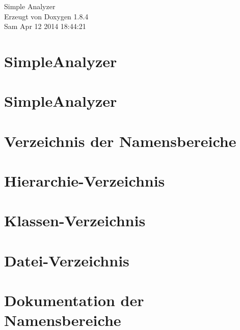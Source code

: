 \documentclass[twoside]{book}
\newcommand{\clearemptydoublepage}{%
  \newpage{\pagestyle{empty}\cleardoublepage}%
}
\begin{document}
\hypersetup{pageanchor=false}
\begin{titlepage}
\vspace*{7cm}
\begin{center}%
{\Large Simple Analyzer }\\
\vspace*{1cm}
{\large Erzeugt von Doxygen 1.8.4}\\
\vspace*{0.5cm}
{\small Sam Apr 12 2014 18:44:21}\\
\end{center}
\end{titlepage}
\clearemptydoublepage
\tableofcontents
\clearemptydoublepage
{}
\hypersetup{pageanchor=true}

\chapter{Simple\-Analyzer}
\label{index}\hypertarget{index}{}
\chapter{Simple\-Analyzer}
\label{md__daten_Projekte_eclipse_workspace_README}
\hypertarget{md__daten_Projekte_eclipse_workspace_README}{}

\chapter{Verzeichnis der Namensbereiche}

\chapter{Hierarchie-\/\-Verzeichnis}

\chapter{Klassen-\/\-Verzeichnis}

\chapter{Datei-\/\-Verzeichnis}

\chapter{Dokumentation der Namensbereiche}


\end{document}

